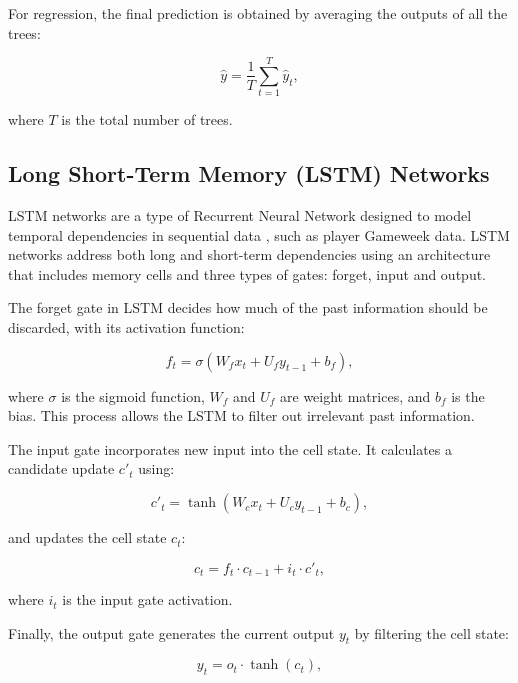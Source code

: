 For regression, the final prediction is obtained by averaging the outputs of all the trees:

\begin{equation} \hat{y} = \frac{1}{T} \sum_{t=1}^{T} \hat{y}_t, \end{equation}

where \( T \) is the total number of trees.

\subsection{Long Short-Term Memory (LSTM) Networks}
LSTM networks are a type of Recurrent Neural Network designed to model temporal dependencies in sequential data \cite{KALA2024569}, such as player Gameweek data. LSTM networks address both long and short-term dependencies using an architecture that includes memory cells and three types of gates: forget, input and output.

The forget gate in LSTM decides how much of the past information should be discarded, with its activation function:

\begin{equation}
    f_t = \sigma \left(W_f x_t + U_f y_{t-1} + b_f\right),
\end{equation}

where \( \sigma \) is the sigmoid function, \( W_f \) and \( U_f \) are weight matrices, and \( b_f \) is the bias. This process allows the LSTM to filter out irrelevant past information.

The input gate incorporates new input into the cell state. It calculates a candidate update \( c'_t \) using:

\begin{equation}
    c'_t = \tanh \left(W_c x_t + U_c y_{t-1} + b_c\right),
\end{equation}

and updates the cell state \( c_t \):

\begin{equation}
    c_t = f_t \cdot c_{t-1} + i_t \cdot c'_t,
\end{equation}

where \( i_t \) is the input gate activation.

Finally, the output gate generates the current output \( y_t \) by filtering the cell state:

\begin{equation}
    y_t = o_t \cdot \tanh(c_t),
\end{equation}

